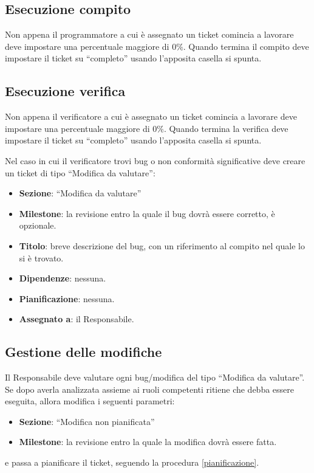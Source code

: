 \subsection{Esecuzione compito}

Non appena il programmatore a cui è assegnato un ticket comincia a lavorare deve impostare una percentuale maggiore di $0\%$. Quando termina il compito deve impostare il ticket su ``completo'' usando l'apposita casella si spunta.

\subsection{Esecuzione verifica}

Non appena il verificatore a cui è assegnato un ticket comincia a lavorare deve impostare una percentuale maggiore di $0\%$. Quando termina la verifica deve impostare il ticket su ``completo'' usando l'apposita casella si spunta.

Nel caso in cui il verificatore trovi bug o non conformità significative deve creare un ticket di tipo ``Modifica da valutare'':
\begin{itemize}
 \item \textbf{Sezione}: ``Modifica da valutare''
 \item \textbf{Milestone}: la revisione entro la quale il bug dovrà essere corretto, è opzionale.
 \item \textbf{Titolo}: breve descrizione del bug, con un riferimento al compito nel quale lo si è trovato.
 \item \textbf{Dipendenze}: nessuna.
 \item \textbf{Pianificazione}: nessuna.
 \item \textbf{Assegnato a}: il Responsabile.
\end{itemize}

\subsection{Gestione delle modifiche}

Il Responsabile deve valutare ogni bug/modifica del tipo ``Modifica da valutare''. Se dopo averla analizzata assieme ai ruoli competenti ritiene che debba essere eseguita, allora modifica i seguenti parametri:
\begin{itemize}
 \item \textbf{Sezione}: ``Modifica non pianificata''
 \item \textbf{Milestone}: la revisione entro la quale la modifica dovrà essere fatta.
\end{itemize}
e passa a pianificare il ticket, seguendo la procedura \ref{pianificazione}.

